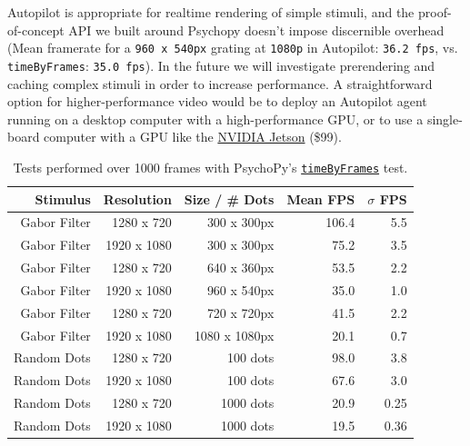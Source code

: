 \documentclass[nohyper, justified, notitlepage, marginals=raggedright,twoside=false,debug]{tufte-autopilot}
\begin{document}
Autopilot is appropriate for realtime rendering of simple stimuli, and the proof-of-concept API we built around Psychopy doesn't impose discernible overhead (Mean framerate for a \texttt{960 x 540px} grating at \texttt{1080p} in Autopilot: \texttt{36.2 fps}, vs. \texttt{timeByFrames}: \texttt{35.0 fps}). In the future we will investigate prerendering and caching complex stimuli in order to increase performance. A straightforward option for higher-performance video would be to deploy an Autopilot agent running on a desktop computer with a high-performance GPU, or to use a single-board computer with a GPU like the \href{https://www.nvidia.com/en-us/autonomous-machines/embedded-systems/jetson-nano/}{NVIDIA Jetson} (\$99).



\begin{table}
\caption{Tests performed over 1000 frames with PsychoPy's \href{https://github.com/psychopy/psychopy/blob/3.1/psychopy/demos/coder/timing/timeByFrames.py}{\texttt{timeByFrames}} test.}
    \begin{tabular}{rrr|rr}
        \toprule
        \textbf{Stimulus} & \textbf{Resolution} & \textbf{Size / \# Dots}& \textbf{Mean FPS} & \textbf{$\sigma$ FPS} \\
        \midrule 
        Gabor Filter & 1280 x 720  & 300 x 300px & 106.4 & 5.5 \\
        Gabor Filter & 1920 x 1080 & 300 x 300px & 75.2 & 3.5\\
        Gabor Filter & 1280 x 720 & 640 x 360px & 53.5 & 2.2\\ 
        Gabor Filter & 1920 x 1080 & 960 x 540px & 35.0 & 1.0 \\
        Gabor Filter & 1280 x 720 & 720 x 720px & 41.5 & 2.2 \\
        Gabor Filter & 1920 x 1080 & 1080 x 1080px & 20.1 & 0.7 \\
        Random Dots & 1280 x 720 & 100 dots & 98.0 & 3.8 \\
        Random Dots & 1920 x 1080 & 100 dots & 67.6 & 3.0 \\
        Random Dots & 1280 x 720 & 1000 dots & 20.9 & 0.25 \\
        Random Dots & 1920 x 1080 & 1000 dots & 19.5 & 0.36 \\
        \bottomrule
    \end{tabular}
    \label{tab:fpstests}
\end{table}
\end{document}

